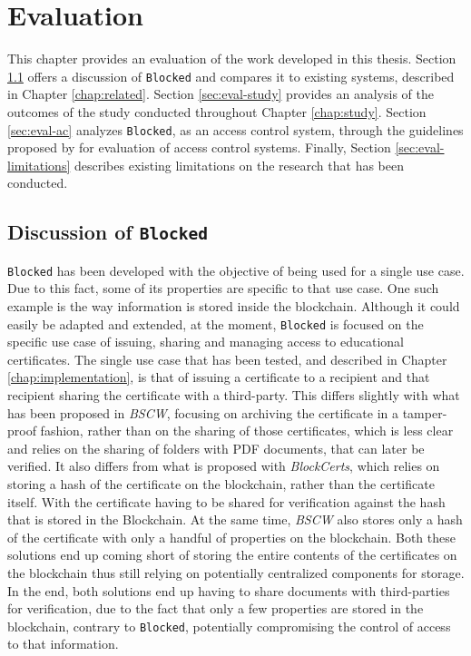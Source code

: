 \chapter{Evaluation}
\label{chap:evaluation}

This chapter provides an evaluation of the work developed in this thesis. Section \ref{sec:eval-analysis} offers a discussion of \texttt{Blocked} and compares it to existing systems, described in Chapter \ref{chap:related}. Section \ref{sec:eval-study} provides an analysis of the outcomes of the study conducted throughout Chapter \ref{chap:study}. Section \ref{sec:eval-ac} analyzes \texttt{Blocked}, as an access control system, through the guidelines proposed by \citeauthor{hu_guidelines_2012} \cite{hu_guidelines_2012} for evaluation of access control systems. Finally, Section \ref{sec:eval-limitations} describes existing limitations on the research that has been conducted.

\section{Discussion of \texttt{Blocked}}
\label{sec:eval-analysis}

\texttt{Blocked} has been developed with the objective of being used for a single use case. Due to this fact, some of its properties are specific to that use case. One such example is the way information is stored inside the blockchain. Although it could easily be adapted and extended, at the moment, \texttt{Blocked} is focused on the specific use case of issuing, sharing and managing access to educational certificates. The single use case that has been tested, and described in Chapter \ref{chap:implementation}, is that of issuing a certificate to a recipient and that recipient sharing the certificate with a third-party. This differs slightly with what has been proposed in \emph{BSCW}, focusing on archiving the certificate in a tamper-proof fashion, rather than on the sharing of those certificates, which is less clear and relies on the sharing of folders with PDF documents, that can later be verified. It also differs from what is proposed with \emph{BlockCerts}, which relies on storing a hash of the certificate on the blockchain, rather than the certificate itself. With the certificate having to be shared for verification against the hash that is stored in the Blockchain. At the same time, \emph{BSCW} also stores only a hash of the certificate with only a handful of properties on the blockchain. Both these solutions end up coming short of storing the entire contents of the certificates on the blockchain thus still relying on potentially centralized components for storage. In the end, both solutions end up having to share documents with third-parties for verification, due to the fact that only a few properties are stored in the blockchain, contrary to \texttt{Blocked}, potentially compromising the control of access to that information.

